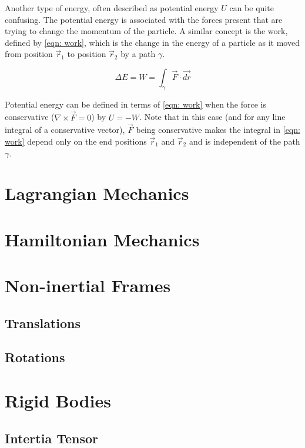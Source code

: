 \documentclass[main.tex]{subfiles}
\begin{document}
Another type of energy, often described as potential energy $U$ can be quite confusing.
The potential energy is associated with the forces present that are trying to change the
momentum of the particle. A similar concept is the work, defined by \cref{eqn: work},
which is the change in the energy of a particle as it moved from position $\vec{r}_1$ to
position $\vec{r}_2$ by a path $\gamma$.


\begin{equation} \label{eqn: work}
\Delta E = W = \int_{\gamma} \vec{F} \cdot \vec{dr}
\end{equation}

Potential energy can be defined in terms of \cref{eqn: work} when the force is
conservative ($\nabla \times \vec{F} = 0$) by $U = -W$. Note that in this case
(and for any line integral of a conservative vector), $\vec{F}$ being conservative makes
the integral in \cref{eqn: work} depend only on the end positions $\vec{r}_1$ and
$\vec{r}_2$ and is independent of the path $\gamma$.



\section{Lagrangian Mechanics}

\section{Hamiltonian Mechanics}

\section{Non-inertial Frames}

\subsection{Translations}

\subsection{Rotations}

\section{Rigid Bodies}

\subsection{Intertia Tensor}
\end{document}

